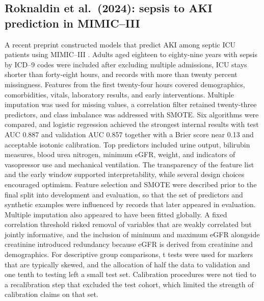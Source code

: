 \subsection{Roknaldin et al.\ (2024): sepsis to AKI prediction in MIMIC--III}
A recent preprint constructed models that predict AKI among septic ICU patients using MIMIC--III \citep{Roknaldin_2024_arXiv}. Adults aged eighteen to eighty-nine years with sepsis by ICD--9 codes were included after excluding multiple admissions, ICU stays shorter than forty-eight hours, and records with more than twenty percent missingness. Features from the first twenty-four hours covered demographics, comorbidities, vitals, laboratory results, and early interventions. Multiple imputation was used for missing values, a correlation filter retained twenty-three predictors, and class imbalance was addressed with SMOTE. Six algorithms were compared, and logistic regression achieved the strongest internal results with test AUC 0.887 and validation AUC 0.857 together with a Brier score near 0.13 and acceptable isotonic calibration. Top predictors included urine output, bilirubin measures, blood urea nitrogen, minimum eGFR, weight, and indicators of vasopressor use and mechanical ventilation. The transparency of the feature list and the early window supported interpretability, while several design choices encouraged optimism. Feature selection and SMOTE were described prior to the final split into development and evaluation, so that the set of predictors and synthetic examples were influenced by records that later appeared in evaluation. Multiple imputation also appeared to have been fitted globally. A fixed correlation threshold risked removal of variables that are weakly correlated but jointly informative, and the inclusion of minimum and maximum eGFR alongside creatinine introduced redundancy because eGFR is derived from creatinine and demographics. For descriptive group comparisons, t tests were used for markers that are typically skewed, and the allocation of half the data to validation and one tenth to testing left a small test set. Calibration procedures were not tied to a recalibration step that excluded the test cohort, which limited the strength of calibration claims on that set.

